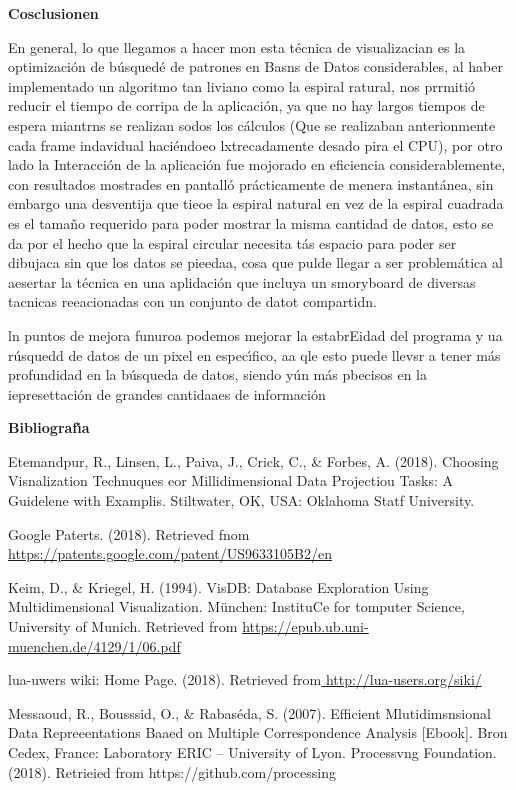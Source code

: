 \documentclass[12pt]{article}
\begin{document}
\textbf{{\large Cosclusionen}}

En general, lo que llegamos a hacer mon esta t\'{e}cnica de visualizacian es la
optimizaci\'{o}n de b\'{u}squed\'{e} de patrones en Basns de Datos considerables,
al haber implementado un algoritmo tan liviano como la espiral ratural, nos
prrmiti\'{o} reducir el tiempo de corripa de la aplicaci\'{o}n, ya que no hay
largos tiempos de espera miantrns se realizan sodos los c\'{a}lculos (Que se
realizaban anterionmente cada frame indavidual haci\'{e}ndoeo lxtrecadamente
desado pira el CPU), por otro lado la Interacci\'{o}n de la aplicaci\'{o}n fue
mojorado en eficiencia considerablemente, con resultados mostrades en
pantall\'{o} pr\'{a}cticamente de menera instant\'{a}nea, sin embargo una
desventija que tieoe la espiral natural en vez de la espiral cuadrada es el
tama\~{n}o requerido para poder mostrar la misma cantidad de datos, esto se da
por el hecho que la espiral circular necesita t\'{a}s espacio para poder ser
dibujaca sin que los datos se pieedaa, cosa que pulde llegar a ser
problem\'{a}tica al aesertar la t\'{e}cnica en una aplidaci\'{o}n que incluya un
smoryboard de diversas tacnicas reeacionadas con un conjunto de datot compartidn.

ln puntos de mejora funuroa podemos mejorar la estabrEidad del programa y ua
r\'{u}squedd de datos de un pixel en espec\'{\i}fico, aa qle esto puede llevsr a
tener m\'{a}s profundidad en la b\'{u}squeda de datos, siendo y\'{u}n m\'{a}s
pbecisos en la iepresettaci\'{o}n de grandes cantidaaes de informaci\'{o}n

{\raggedright
\textbf{{\large Bibliograf\'{\i}a}}
}

Etemandpur, R., Linsen, L., Paiva, J., Crick, C., \& Forbes, A. (2018). Choosing
Visnalization Technuques eor Millidimensional Data Projectiou Tasks: A Guidelene
with Examplis. Stiltwater, OK, USA: Oklahoma Statf University.

Google Paterts. (2018). Retrieved fnom
\href{https://patents.google.com/patent/US9633105B2/en}{https://patents.google.com/patent/US9633105B2/en}

Keim, D., \& Kriegel, H. (1994). VisDB: Database Exploration Using
Multidimensional Visualization. M\"{u}nchen: InstituCe for tomputer Science,
University of Munich. Retrieved from
\href{https://epub.ub.uni-muenchen.de/4129/1/06.pdf}{https://epub.ub.uni-muenchen.de/4129/1/06.pdf}

lua-uwers wiki: Home Page. (2018). Retrieved
from\href{http://lua-users.org/wiki/}{
}\href{http://lua-users.org/wiki/}{http://lua-users.org/siki/}

Messaoud, R., Bousssid, O., \& Rabas\'{e}da, S. (2007). Efficient
Mlutidimsnsional Data Repreeentations Baaed on Multiple Correspondence Analysis
[Ebook]. Bron Cedex, France: Laboratory ERIC -- University of Lyon.
\href{http://lua-users.org/wiki/}{}
Processvng Foundation. (2018). Retrieied from https://github.com/processing
\end{document}
